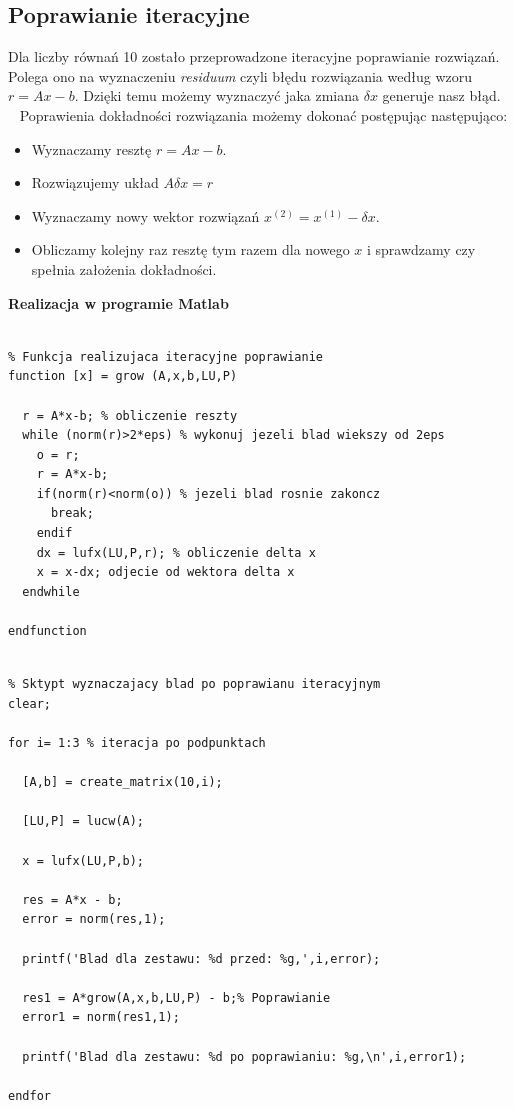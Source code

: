 \documentclass[a4paper, 11pt]{article}
\begin{document}
\subsection{Poprawianie iteracyjne}
Dla liczby równań 10 zostało przeprowadzone iteracyjne poprawianie rozwiązań. Polega ono na wyznaczeniu \textsl{residuum} czyli błędu rozwiązania według wzoru $r = Ax -b$. Dzięki temu możemy wyznaczyć jaka zmiana $\delta x$ generuje nasz błąd. ~\cite{fifth}
Poprawienia dokładności rozwiązania możemy dokonać postępując następująco: 
\begin{itemize}
\item Wyznaczamy resztę $r = Ax -b$.
\item Rozwiązujemy układ $A\delta x = r$
\item Wyznaczamy nowy wektor rozwiązań $x^{(2)} = x^{(1)} -\delta x$.
\item Obliczamy kolejny raz resztę tym razem dla nowego $x$ i sprawdzamy czy spełnia założenia dokładności.
\end{itemize}

\textbf{Realizacja w programie Matlab}\\
\\
\begin{lstlisting}
% Funkcja realizujaca iteracyjne poprawianie
function [x] = grow (A,x,b,LU,P)

  r = A*x-b; % obliczenie reszty
  while (norm(r)>2*eps) % wykonuj jezeli blad wiekszy od 2eps
    o = r; 
    r = A*x-b;
    if(norm(r)<norm(o)) % jezeli blad rosnie zakoncz
      break; 
    endif
    dx = lufx(LU,P,r); % obliczenie delta x
    x = x-dx; odjecie od wektora delta x
  endwhile

endfunction

\end{lstlisting}

\begin{lstlisting}

% Sktypt wyznaczajacy blad po poprawianu iteracyjnym
clear;

for i= 1:3 % iteracja po podpunktach
  
  [A,b] = create_matrix(10,i);

  [LU,P] = lucw(A);
  
  x = lufx(LU,P,b);
  
  res = A*x - b;
  error = norm(res,1); 
  
  printf('Blad dla zestawu: %d przed: %g,',i,error); 
   
  res1 = A*grow(A,x,b,LU,P) - b;% Poprawianie
  error1 = norm(res1,1);
  
  printf('Blad dla zestawu: %d po poprawianiu: %g,\n',i,error1);
  
endfor

\end{lstlisting}
\end{document}
